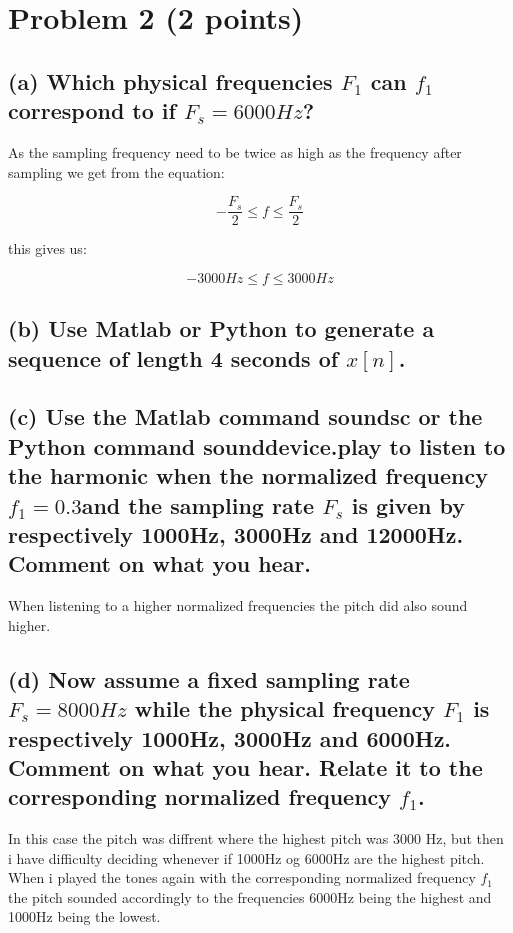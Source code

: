 \section{Problem 2 (2 points)}

\subsection*{(a) Which physical frequencies $F_1$ can $f_1$ correspond to if $F_s = 6000Hz$?}
As the sampling frequency need to be twice as high as the frequency after sampling we get from the equation:

\begin{equation*}
    -\frac{F_s}{2}\leq f \leq \frac{F_s}{2}
\end{equation*}

this gives us:

\begin{equation*}
    -3000Hz\leq f \leq 3000Hz
\end{equation*}


\subsection*{(b)  Use Matlab or Python to generate a sequence of length 4 seconds of $x[n]$.}

\subsection*{(c)  Use the Matlab command soundsc or the Python command sounddevice.play to listen to the harmonic when the normalized frequency $f_1 = 0.3 $and the sampling rate $F_s$ is given by respectively 1000Hz, 3000Hz and 12000Hz.
Comment on what you hear.}

When listening to a higher normalized frequencies the pitch did also sound higher.

\subsection*{(d) Now assume a fixed sampling rate $F_s = 8000Hz$ while the physical frequency $F_1$ is respectively 1000Hz, 3000Hz and 6000Hz. Comment on what you hear. Relate it to the corresponding normalized frequency $f_1$.}

In this case the pitch was diffrent where the highest pitch was 3000 Hz, but then i have difficulty deciding whenever if 1000Hz og 6000Hz are the highest pitch. When i played the tones again with the corresponding normalized frequency $f_1$ the pitch sounded accordingly to the frequencies 6000Hz being the highest and 1000Hz being the lowest.